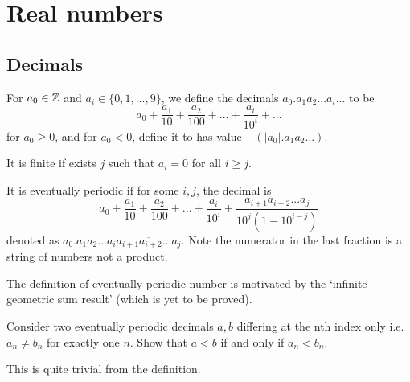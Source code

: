 \documentclass[11pt]{article}
\begin{document}
\maketitle{}
\tableofcontents{}
\pagebreak

\section{Real numbers}
\subsection{Decimals}
\begin{definition}[Decimals]
  For \(a_0 \in \mathbb{Z}\) and \(a_i \in \{0,1,...,9\}\), we define the decimals \(a_0.a_1a_2...a_i...\) to be 
  \begin{equation*}
    a_0+\frac{a_1}{10}+\frac{a_2}{100}+...+\frac{a_i}{10^i}+...
  \end{equation*}
  for \(a_0 \geq 0\), and for \(a_0<0\), define it to has value \(-(|a_0|.a_1a_2...)\).

  \vspace{5pt}It is finite if exists \(j\) such that \(a_i=0\) for all \(i \geq j\).

  \vspace{5pt}It is eventually periodic if for some \(i,j\), the decimal is
  \begin{equation*}
    a_0+\frac{a_1}{10}+\frac{a_2}{100}+...+\frac{a_i}{10^i}+\frac{a_{i+1}a_{i+2}...a_j}{10^j(1-10^{i-j})}
  \end{equation*}
  denoted as \(a_0.a_1a_2...a_i\overline{a_{i+1}a_{i+2}...a_j}\). Note the numerator in the last fraction is a string of numbers not a product.
\end{definition}

The definition of eventually periodic number is motivated by the `infinite geometric sum result' (which is yet to be proved).
\begin{exercise}
  Consider two eventually periodic decimals \(a,b\) differing at the nth index only i.e. \(a_n \neq b_n\) for exactly one \(n\). Show that \(a<b\) if and only if \(a_n<b_n\).
\end{exercise}
\begin{solution}
  This is quite trivial from the definition.
\end{solution}
\end{document}
